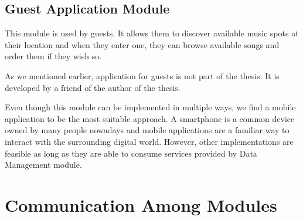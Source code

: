\subsection{Guest Application Module}

This module is used by guests. It allows them to discover available music spots at their location and when they enter one, they can browse available songs and order them if they wish so.
\par
As we mentioned earlier, application for guests is not part of the thesis. It is developed by a friend of the author of the thesis.
\par
Even though this module can be implemented in multiple ways, we find a mobile application to be the most suitable approach. A smartphone is a common device owned by many people nowadays and mobile applications are a familiar way to interact with the surrounding digital world. However, other implementations are feasible as long as they are able to consume services provided by Data Management module.

\section{Communication Among Modules}

